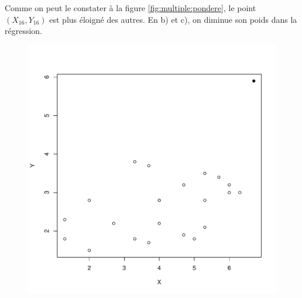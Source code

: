 \begin{solution}{3.17}
    Comme on peut le constater à la figure \ref{fig:multiple:pondere},
    le point $(X_{16}, Y_{16})$ est plus éloigné des autres. En b) et
    c), on diminue son poids dans la régression.
    \begin{figure}
      \centering
\begin{knitrout}
\color{fgcolor}\begin{kframe}
\begin{alltt}
 \hlopt{~}   
\hlopt{$}\hlstd{X[}\hlstd{], donnees}\hlopt{$}\hlstd{Y[}\hlstd{],}  \hlstd{=} \hlstd{)}
\end{alltt}
\end{kframe}
\includegraphics[width=\maxwidth]{figure/unnamed-chunk-43-1}


\end{knitrout}
\end{figure}
\end{solution}
